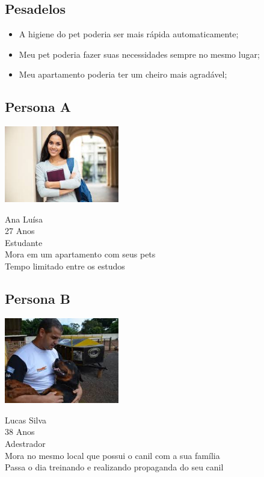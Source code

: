 \documentclass[12pt,a4paper]{article}
\begin{document}
\subsection{Pesadelos}
\begin{itemize}
	\item A higiene do pet poderia ser mais rápida
		automaticamente;
	\item Meu pet poderia fazer suas necessidades sempre no mesmo lugar;
	\item Meu apartamento poderia ter um cheiro mais agradável;
\end{itemize}

\subsection{Persona A}

\begin{minipage}{0.3\textwidth}
	\includegraphics[width=5cm]{universitaria}
\end{minipage}%
\hfill%
\begin{minipage}{0.6\textwidth}\raggedleft
	Ana Luísa \\
	27 Anos \\
	Estudante \\
	Mora em um apartamento com seus pets \\
	Tempo limitado entre os estudos
\end{minipage}

\subsection{Persona B}

\begin{minipage}{0.3\textwidth}
	\includegraphics[width=5cm]{canil}
\end{minipage}%
\hfill%
\begin{minipage}{0.6\textwidth}\raggedleft
	Lucas Silva \\
	38 Anos \\
	Adestrador \\
	Mora no mesmo local que possui o canil com a sua família \\
	Passa o dia treinando e realizando propaganda do seu canil
\end{minipage}
\end{document}
